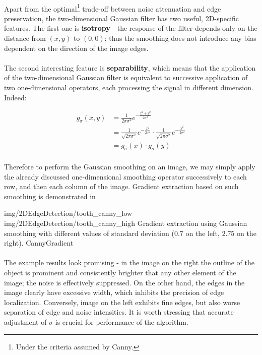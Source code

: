 \paragraph*{}
Apart from the optimal\footnote{Under the criteria assumed by Canny.} trade-off between noise attenuation and edge preservation, the two-dimensional Gaussian filter has two useful, 2D-specific features. The first one is \textbf{isotropy} - the response of the filter depends only on the distance from $(x,y)$ to $(0,0)$; thus the smoothing does not introduce any bias dependent on the direction of the image edges. 

\paragraph*{}
The second interesting feature is \textbf{separability}, which means that the application of the two-dimensional Gaussian filter is equivalent to successive application of two one-dimensional operators, each processing the signal in different dimension. Indeed:

\begin{align*}
    g_{\sigma}(x,y) &= \frac{1}{2\pi \sigma^2} e^{-\frac{x^2+y^2}{2 \sigma^2}} \\
    				&= \frac{1}{\sqrt{2\pi \sigma^2}} e^{-\frac{x^2}{2 \sigma^2}} \cdot \frac{1}{\sqrt{2\pi \sigma^2}} e^{-\frac{y^2}{2 \sigma^2}} \\
    				&= g_{\sigma}(x)\cdot g_{\sigma}(y)
\end{align*}

\paragraph*{}
Therefore to perform the Gaussian smoothing on an image, we may simply apply the already discussed one-dimensional smoothing operator successively to each row, and then each column of the image. Gradient extraction based on such smoothing is demonstrated in .

\twoFigures
{img/2DEdgeDetection/tooth_canny_low}
{img/2DEdgeDetection/tooth_canny_high}
{Gradient extraction using Gaussian smoothing with different values of standard deviation ($0.7$ on the left, $2.75$ on the right).}
{CannyGradient}
{\basicWidth}

\paragraph*{}
The example results look promising - in the image on the right the outline of the object is prominent and consistently brighter that any other element of the image; the noise is effectively suppressed. On the other hand, the edges in the image clearly have excessive width, which inhibits the precision of edge localization. Conversely, image on the left exhibits fine edges, but also worse separation of edge and noise intensities. It is worth stressing that accurate adjustment of $\sigma$ is crucial for performance of the algorithm.

